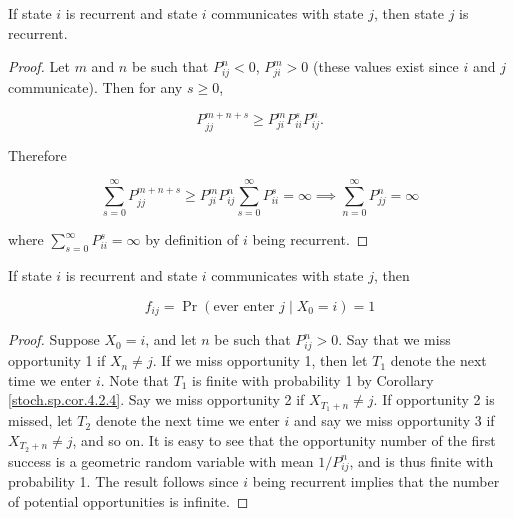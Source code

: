 \begin{corollary}\label{stoch.sp.cor.4.2.4}  If state \(i\) is recurrent and state \(i\) communicates with state \(j\), then state \(j\) is recurrent.

\end{corollary}

\begin{proof}Let \(m\) and \(n\) be such that \(P_{ij}^n < 0\), \(P_{ji}^m>0\) (these values exist since \(i\) and \(j\) communicate). Then for any \(s  \geq 0\),

\[
P_{jj}^{m+n+s} \geq P_{ji}^m P_{ii}^sP_{ij}^n.
\]

Therefore

\[
\sum_{s=0}^\infty P_{jj}^{m+n+s} \geq P_{ji}^m P_{ij}^n \sum_{s=0}^\infty P_{ii}^s = \infty \implies \sum_{n=0}^\infty P_{jj}^n = \infty
\]

where \( \sum_{s=0}^\infty P_{ii}^s= \infty\) by definition of \(i\) being recurrent.

\end{proof}

\begin{corollary}  If state \(i\) is recurrent and state \(i\) communicates with state \(j\), then

\[
f_{ij} = \Pr(\text{ever enter }j \mid X_0 =i) = 1
\]

\end{corollary}

\begin{proof} Suppose \(X_0 = i\), and let \(n\) be such that \(P_{ij}^n > 0\). Say that we miss opportunity 1 if \(X_n \neq j\). If we miss opportunity 1, then let \(T_1\) denote the next time we enter \(i\). Note that \(T_1\) is finite with probability 1 by Corollary \ref{stoch.sp.cor.4.2.4}. Say we miss opportunity 2 if \(X_{T_1 + n} \neq j\). If opportunity 2 is missed, let \(T_2\) denote the next time we enter \(i\) and say we miss opportunity 3 if \(X_{T_2 + n} \neq j\), and so on. It is easy to see that the opportunity number of the first success is a geometric random variable with mean \(1/P_{ij}^n\), and is thus finite with probability 1. The result follows since \(i\) being recurrent implies that the number of potential opportunities is infinite.

\end{proof}

